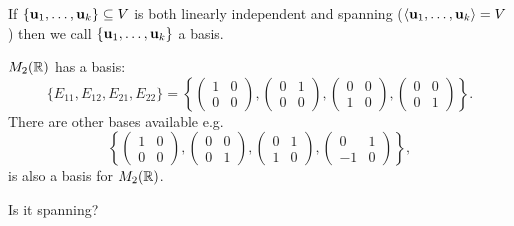 \documentclass[10pt, a4paper]{article}
\begin{document}
\begin{definition}[Basis]
    If $\{\mathbf{u}_1, \dotsc, \mathbf{u}_k\} \subseteq V$ is both linearly independent and spanning
    ($\langle\mathbf{u}_1, \dotsc, \mathbf{u}_k\rangle = V$)
    then we call $\{\mathbf{u}_1, \dotsc, \mathbf{u}_k\}$ a basis.
\end{definition}

$M_2(\mathbb{R})$ has a basis:
\[
\{E_{11}, E_{12}, E_{21}, E_{22}\} = \left\{\begin{pmatrix}
    1 & 0 \\ 0 & 0
\end{pmatrix}, \begin{pmatrix}
    0 & 1 \\ 0 & 0
\end{pmatrix},
\begin{pmatrix}
    0 & 0 \\ 1 & 0
\end{pmatrix}, \begin{pmatrix}
    0 & 0 \\ 0 & 1
\end{pmatrix}\right\}.
\]
There are other bases available e.g.
\[
\left\{\begin{pmatrix}
    1 & 0 \\ 0 & 0
\end{pmatrix}, \begin{pmatrix}
    0 & 0 \\ 0 & 1
\end{pmatrix},
\begin{pmatrix}
    0 & 1 \\ 1 & 0
\end{pmatrix}, \begin{pmatrix}
    0 & 1 \\ -1 & 0
\end{pmatrix}\right\},
\]
is also a basis for $M_2(\mathbb{R})$.

Is it spanning?
\end{document}
